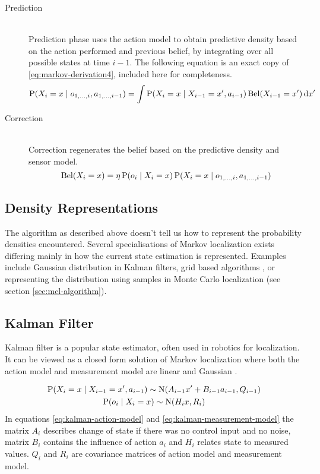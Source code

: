 \begin{description}
\item[Prediction] \hfill \\
	Prediction phase uses the action model to obtain predictive density based on the action performed
	and previous belief, by integrating over all possible states at time \(i - 1\).
	The following equation is an exact copy of \eqref{eq:markov-derivation4}, included here for completeness.
	\begin{equation}
		\label{eq:markov-prediction}
		\operatorname{\mathrm{P}}(X_i = x \mid o_{1, \dotsc, i}, a_{1, \dotsc, i - 1}) =
		\int
		\operatorname{\mathrm{P}}(X_i = x \mid X_{i - 1}=x', a_{i - 1})
		\operatorname{\mathrm{Bel}}(X_{i-1} = x')
		\,\mathrm{d}x'
	\end{equation}

\item[Correction] \hfill \\
	Correction regenerates the belief based on the predictive density
	and sensor model.
	\begin{equation}
		\label{eq:markov-correction}
		\operatorname{\mathrm{Bel}}(X_i = x) =
		\eta \operatorname{\mathrm{P}}(o_i \mid X_i = x)
		\operatorname{\mathrm{P}}(X_i = x \mid o_{1, \dotsc, i}, a_{1, \dotsc, i - 1})
	\end{equation}
\end{description}

\subsection{Density Representations}
The algorithm as described above doesn't tell us how to represent the probability
densities encountered.
Several specialisations of Markov localization exists differing mainly in how the
current state estimation is represented.
Examples include Gaussian distribution in Kalman filters,
grid based algorithms \cite{fox98}, or representing the distribution
using samples in Monte Carlo localization (see section \ref{sec:mcl-algorithm}).

\subsection{Kalman Filter}
\label{sec:kalman}
Kalman filter \cite{kalman60,welch95} is a popular state estimator, often used in robotics
for localization.
It can be viewed as a closed form solution of Markov localization where both the
action model and measurement model are linear and Gaussian \cite{diard03}.

\begin{gather}
	\label{eq:kalman-action-model}
	\operatorname{\mathrm{P}}(X_i = x \mid X_{i-1} = x', a_{i - 1}) \sim \mathrm{N}(A_{i - 1}x' + B_{i - 1}a_{i - 1}, Q_{i - 1})
	\\
	\label{eq:kalman-measurement-model}
	\operatorname{\mathrm{P}}(o_{i} \mid X_i = x) \sim \mathrm{N}(H_{i}x, R_i)
\end{gather}
In equations \eqref{eq:kalman-action-model} and \eqref{eq:kalman-measurement-model}
the matrix \(A_i\) describes change of state if there was no control input and no noise,
matrix \(B_i\) contains the influence of action \(a_i\) and \(H_i\) relates state to measured
values.
\(Q_i\) and \(R_i\) are covariance matrices of action model and measurement model.

